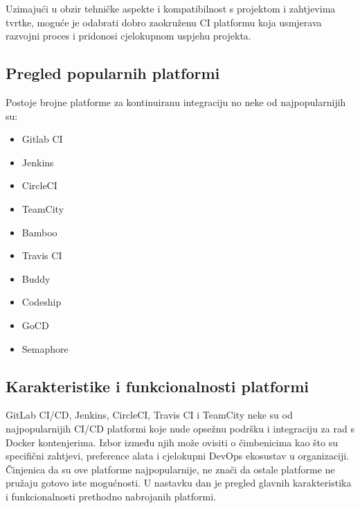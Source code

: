 \documentclass[a4paper,12pt,oneside]{article}
\begin{document}
Uzimajući u obzir tehničke aspekte i kompatibilnost s projektom i zahtjevima tvrtke, moguće je odabrati dobro zaokruženu CI platformu koja usmjerava razvojni proces i pridonosi cjelokupnom uspjehu projekta.

\newpage

\subsection{Pregled popularnih platformi}
Postoje brojne platforme za kontinuiranu integraciju no neke od najpopularnijih su:

\begin{multicols}{2}
\begin{itemize}
\item Gitlab CI
\item Jenkins
\item CircleCI
\item TeamCity
\item Bamboo
\item Travis CI
\item Buddy
\item Codeship
\item GoCD
\item Semaphore
\end{itemize}
\end{multicols}



\subsection{Karakteristike i funkcionalnosti platformi}
GitLab CI/CD, Jenkins, CircleCI, Travis CI i TeamCity neke su od najpopularnijih CI/CD platformi koje nude opsežnu podršku i integraciju za rad s Docker kontenjerima. Izbor između njih može ovisiti o čimbenicima kao što su specifični zahtjevi, preference alata i cjelokupni DevOps ekosustav u organizaciji. Činjenica da su ove platforme najpopularnije, ne znači da ostale platforme ne pružaju gotovo iste mogućnosti. U nastavku dan je pregled glavnih karakteristika i funkcionalnosti prethodno nabrojanih platformi.
\end{document}
